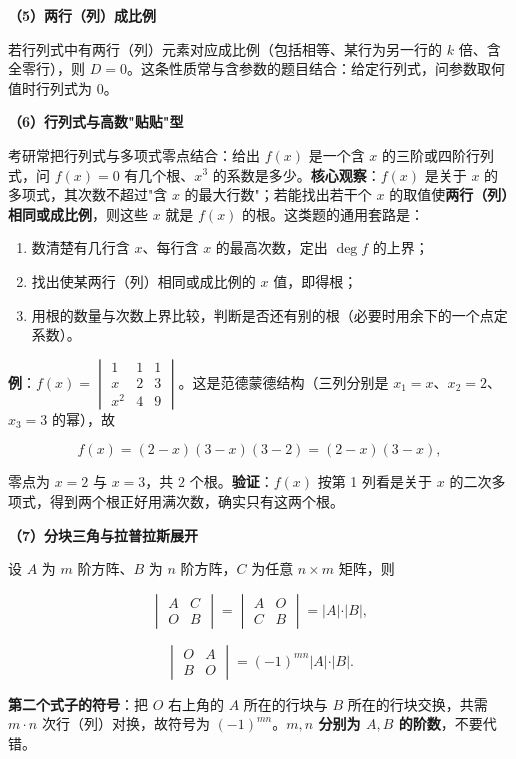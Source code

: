 \documentclass[11pt,openany,UTF8]{ctexbook}
\begin{document}
\textbf{（5）两行（列）成比例}

若行列式中有两行（列）元素对应成比例（包括相等、某行为另一行的 $k$ 倍、含全零行），则 $D=0$。这条性质常与含参数的题目结合：给定行列式，问参数取何值时行列式为 $0$。

\textbf{（6）行列式与高数"贴贴"型}

考研常把行列式与多项式零点结合：给出 $f(x)$ 是一个含 $x$ 的三阶或四阶行列式，问 $f(x)=0$ 有几个根、$x^3$ 的系数是多少。\textbf{核心观察}：$f(x)$ 是关于 $x$ 的多项式，其次数不超过"含 $x$ 的最大行数"；若能找出若干个 $x$ 的取值使\textbf{两行（列）相同或成比例}，则这些 $x$ 就是 $f(x)$ 的根。这类题的通用套路是：

\begin{enumerate}
\item 数清楚有几行含 $x$、每行含 $x$ 的最高次数，定出 $\deg f$ 的上界；
\item 找出使某两行（列）相同或成比例的 $x$ 值，即得根；
\item 用根的数量与次数上界比较，判断是否还有别的根（必要时用余下的一个点定系数）。
\end{enumerate}
\textbf{例}：$f(x)=\begin{vmatrix}1&1&1\\x&2&3\\x^2&4&9\end{vmatrix}$。这是范德蒙德结构（三列分别是 $x_1=x$、$x_2=2$、$x_3=3$ 的幂），故

\[f(x)=(2-x)(3-x)(3-2)=(2-x)(3-x),\]

零点为 $x=2$ 与 $x=3$，共 $2$ 个根。\textbf{验证}：$f(x)$ 按第 1 列看是关于 $x$ 的二次多项式，得到两个根正好用满次数，确实只有这两个根。

\textbf{（7）分块三角与拉普拉斯展开}

设 $A$ 为 $m$ 阶方阵、$B$ 为 $n$ 阶方阵，$C$ 为任意 $n\times m$ 矩阵，则

\[\begin{vmatrix}A&C\\O&B\end{vmatrix}=\begin{vmatrix}A&O\\C&B\end{vmatrix}=\vert A\vert\cdot\vert B\vert,\]

\[\begin{vmatrix}O&A\\B&O\end{vmatrix}=(-1)^{mn}\vert A\vert\cdot\vert B\vert .\]

\textbf{第二个式子的符号}：把 $O$ 右上角的 $A$ 所在的行块与 $B$ 所在的行块交换，共需 $m\cdot n$ 次行（列）对换，故符号为 $(-1)^{mn}$。\textbf{$m,n$ 分别为 $A,B$ 的阶数}，不要代错。
\end{document}
